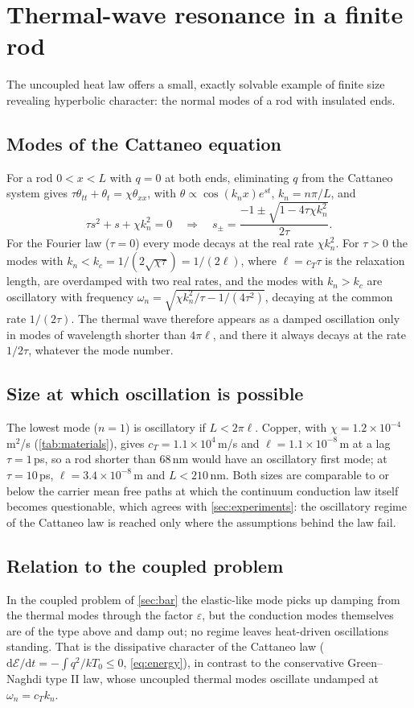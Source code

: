 \section{Thermal-wave resonance in a finite rod}\label{sec:thermalmodes}

The uncoupled heat law offers a small, exactly solvable example of finite size revealing hyperbolic character: the normal modes of a rod with insulated ends.

\subsection{Modes of the Cattaneo equation}
For a rod $0<x<L$ with $q=0$ at both ends, eliminating $q$ from the Cattaneo system gives $\tau\theta_{tt}+\theta_t=\chi\theta_{xx}$, with $\theta\propto\cos(k_nx)e^{st}$, $k_n=n\pi/L$, and
\begin{equation}
\tau s^2+s+\chi k_n^2=0\quad\Rightarrow\quad s_\pm=\frac{-1\pm\sqrt{1-4\tau\chi k_n^2}}{2\tau}.
\end{equation}
For the Fourier law ($\tau=0$) every mode decays at the real rate $\chi k_n^2$. For $\tau>0$ the modes with $k_n<k_c=1/(2\sqrt{\chi\tau})=1/(2\ell)$, where $\ell=c_T\tau$ is the relaxation length, are overdamped with two real rates, and the modes with $k_n>k_c$ are oscillatory with frequency $\omega_n=\sqrt{\chi k_n^2/\tau-1/(4\tau^2)}$, decaying at the common rate $1/(2\tau)$. The thermal wave therefore appears as a damped oscillation only in modes of wavelength shorter than $4\pi\ell$, and there it always decays at the rate $1/2\tau$, whatever the mode number.

\subsection{Size at which oscillation is possible}
The lowest mode ($n=1$) is oscillatory if $L<2\pi\ell$. Copper, with $\chi=1.2\times10^{-4}$\,m$^2$/s (\cref{tab:materials}), gives $c_T=1.1\times10^{4}$\,m/s and $\ell=1.1\times10^{-8}$\,m at a lag $\tau=1$\,ps, so a rod shorter than $68$\,nm would have an oscillatory first mode; at $\tau=10$\,ps, $\ell=3.4\times10^{-8}$\,m and $L<210$\,nm. Both sizes are comparable to or below the carrier mean free paths at which the continuum conduction law itself becomes questionable, which agrees with \cref{sec:experiments}: the oscillatory regime of the Cattaneo law is reached only where the assumptions behind the law fail.

\subsection{Relation to the coupled problem}
In the coupled problem of \cref{sec:bar} the elastic-like mode picks up damping from the thermal modes through the factor $\varepsilon$, but the conduction modes themselves are of the type above and damp out; no regime leaves heat-driven oscillations standing. That is the dissipative character of the Cattaneo law ($\mathrm{d}\mathcal E/\mathrm{d}t=-\int q^2/kT_0\le0$, \cref{eq:energy}), in contrast to the conservative Green--Naghdi type II law, whose uncoupled thermal modes oscillate undamped at $\omega_n=c_Tk_n$.


